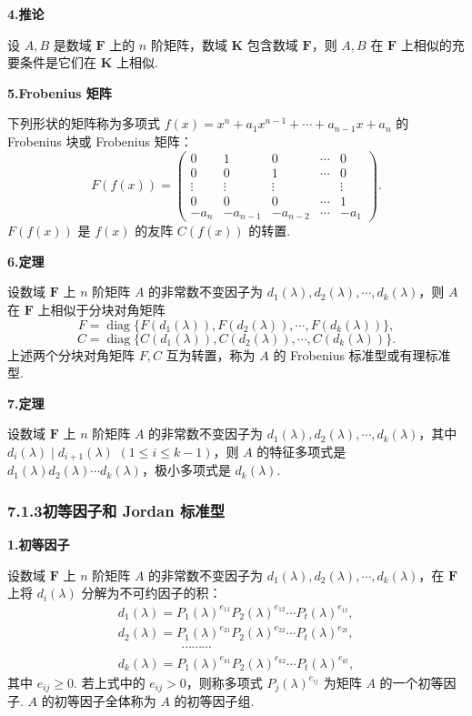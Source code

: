 \documentclass[UTF8,12pt,a4paper,fontset=fandol]{ctexart}
\begin{document}
\noindent\textbf{4.\quad 推论}

设 $A,B$ 是数域 $\mathbf{F}$ 上的 $n$ 阶矩阵，数域 $\mathbf{K}$ 包含数域 $\mathbf{F}$，则 $A,B$ 在 $\mathbf{F}$ 上相似的充要条件是它们在 $\mathbf{K}$ 上相似.

\noindent\textbf{5.\quad Frobenius 矩阵}

下列形状的矩阵称为多项式 $f(x)=x^n+a_1x^{n-1}+\cdots+a_{n-1}x+a_n$ 的 Frobenius 块或 Frobenius 矩阵：
\[
F(f(x))=
\left(\begin{array}{ccccc}
0 & 1 & 0 & \cdots & 0\\
0 & 0 & 1 & \cdots & 0\\
\vdots & \vdots & \vdots &        & \vdots\\
0 & 0 & 0 & \cdots & 1\\
-a_n & -a_{n-1} & -a_{n-2} & \cdots & -a_1
\end{array}\right).
\]
$F(f(x))$ 是 $f(x)$ 的友阵 $C(f(x))$ 的转置.

\noindent\textbf{6.\quad 定理}

设数域 $\mathbf{F}$ 上 $n$ 阶矩阵 $A$ 的非常数不变因子为 $d_1(\lambda),d_2(\lambda),\cdots,d_k(\lambda)$，则 $A$ 在 $\mathbf{F}$ 上相似于分块对角矩阵
\begin{equation}
F=\operatorname{diag}\{F(d_1(\lambda)),F(d_2(\lambda)),\cdots,F(d_k(\lambda))\},
\tag{7.3}
\end{equation}
\begin{equation}
C=\operatorname{diag}\{C(d_1(\lambda)),C(d_2(\lambda)),\cdots,C(d_k(\lambda))\}.
\tag{7.4}
\end{equation}
上述两个分块对角矩阵 $F,C$ 互为转置，称为 $A$ 的 Frobenius 标准型或有理标准型.

\noindent\textbf{7.\quad 定理}

设数域 $\mathbf{F}$ 上 $n$ 阶矩阵 $A$ 的非常数不变因子为 $d_1(\lambda),d_2(\lambda),\cdots,d_k(\lambda)$，其中 $d_i(\lambda)\mid d_{i+1}(\lambda)$ $(1\le i\le k-1)$，则 $A$ 的特征多项式是 $d_1(\lambda)d_2(\lambda)\cdots d_k(\lambda)$，极小多项式是 $d_k(\lambda)$.

\subsubsection*{7.1.3\quad 初等因子和 Jordan 标准型}

\noindent\textbf{1.\quad 初等因子}

设数域 $\mathbf{F}$ 上 $n$ 阶矩阵 $A$ 的非常数不变因子为 $d_1(\lambda),d_2(\lambda),\cdots,d_k(\lambda)$，在 $\mathbf{F}$ 上将 $d_i(\lambda)$ 分解为不可约因子的积：
\[
\begin{array}{l}
d_1(\lambda)=P_1(\lambda)^{e_{11}}P_2(\lambda)^{e_{12}}\cdots P_t(\lambda)^{e_{1t}},\\
d_2(\lambda)=P_1(\lambda)^{e_{21}}P_2(\lambda)^{e_{22}}\cdots P_t(\lambda)^{e_{2t}},\\
\hspace{5em}\cdots\cdots\cdots\\
d_k(\lambda)=P_1(\lambda)^{e_{k1}}P_2(\lambda)^{e_{k2}}\cdots P_t(\lambda)^{e_{kt}},
\end{array}
\]
其中 $e_{ij}\ge 0$. 若上式中的 $e_{ij}>0$，则称多项式 $P_j(\lambda)^{e_{ij}}$ 为矩阵 $A$ 的一个初等因子. $A$ 的初等因子全体称为 $A$ 的初等因子组.
\end{document}
